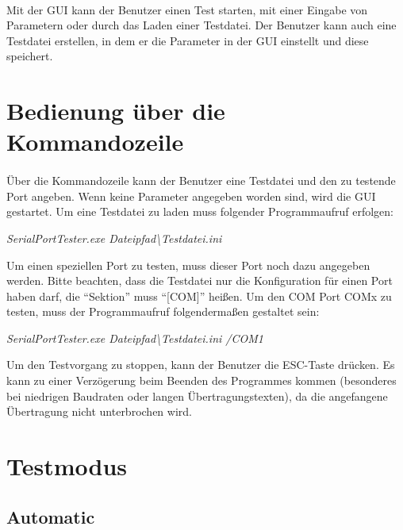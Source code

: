 \paragraph{}
Mit der GUI kann der Benutzer einen Test starten, mit einer Eingabe von Parametern oder durch das Laden einer Testdatei. Der Benutzer kann auch eine Testdatei erstellen, in dem er die Parameter in der GUI einstellt und diese speichert.

\section{Bedienung über die Kommandozeile}
\paragraph{}
Über die Kommandozeile kann der Benutzer eine Testdatei und den zu testende Port angeben. Wenn keine Parameter angegeben worden sind, wird die GUI gestartet. Um eine Testdatei zu laden muss folgender Programmaufruf erfolgen:
\begin{center}
\textit{SerialPortTester.exe Dateipfad\textbackslash Testdatei.ini}
\end{center}

Um einen speziellen Port zu testen, muss dieser Port noch dazu angegeben werden. Bitte beachten, dass die Testdatei nur die Konfiguration für einen Port haben darf, die "`Sektion"' muss "`[COM]"' heißen. Um den COM Port COMx zu testen, muss der Programmaufruf folgendermaßen gestaltet sein:

\begin{center}
\textit{SerialPortTester.exe Dateipfad\textbackslash Testdatei.ini /COM1}
\end{center}

Um den Testvorgang zu stoppen, kann der Benutzer die ESC-Taste drücken. Es kann zu einer Verzögerung beim Beenden des Programmes kommen (besonderes bei niedrigen Baudraten oder langen Übertragungstexten), da die angefangene Übertragung nicht unterbrochen wird.


\section{Testmodus}

\subsection{Automatic}
